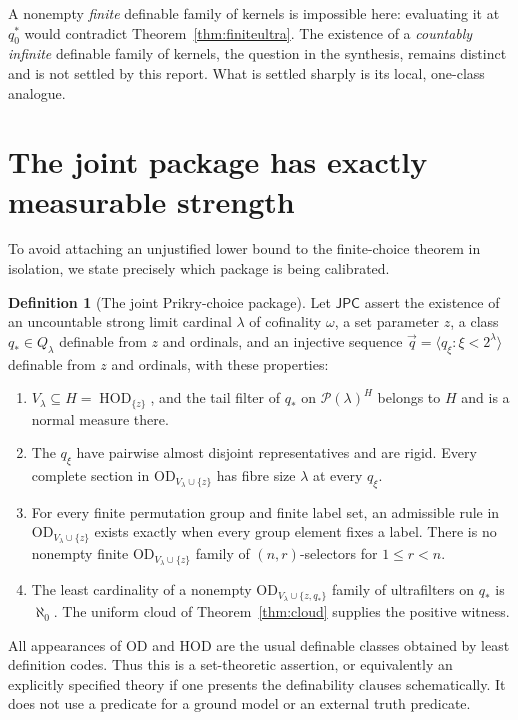 \documentclass[11pt,letterpaper]{article}
\theoremstyle{definition}
\newtheorem{definition}{Definition}[section]
\numberwithin{equation}{section}
\newcommand{\HOD}{\mathrm{HOD}}
\newcommand{\OD}{\mathrm{OD}}
\newcommand{\Pow}{\mathcal P}
\newcommand{\HD}[1]{\operatorname{HOD}_{\{#1\}}}
\begin{document}
A nonempty \emph{finite} definable family of kernels is impossible here: evaluating it at $q_0^*$ would contradict Theorem~\ref{thm:finiteultra}. The existence of a \emph{countably infinite} definable family of kernels, the question in the synthesis, remains distinct and is not settled by this report. What is settled sharply is its local, one-class analogue.

\section{The joint package has exactly measurable strength}\label{sec:consistency}

To avoid attaching an unjustified lower bound to the finite-choice theorem in isolation, we state precisely which package is being calibrated.

\begin{definition}[The joint Prikry-choice package]\label{def:package}
Let $\mathsf{JPC}$ assert the existence of an uncountable strong limit cardinal $\lambda$ of cofinality $\omega$, a set parameter $z$, a class $q_*\in Q_\lambda$ definable from $z$ and ordinals, and an injective sequence $\vec q=\langle q_\xi:\xi<2^\lambda\rangle$ definable from $z$ and ordinals, with these properties:
\begin{enumerate}
\item $V_\lambda\subseteq H=\HD{z}$, and the tail filter of $q_*$ on $\Pow(\lambda)^H$ belongs to $H$ and is a normal measure there.
\item The $q_\xi$ have pairwise almost disjoint representatives and are rigid. Every complete section in $\OD_{V_\lambda\cup\{z\}}$ has fibre size $\lambda$ at every $q_\xi$.
\item For every finite permutation group and finite label set, an admissible rule in $\OD_{V_\lambda\cup\{z\}}$ exists exactly when every group element fixes a label. There is no nonempty finite $\OD_{V_\lambda\cup\{z\}}$ family of $(n,r)$-selectors for $1\le r<n$.
\item The least cardinality of a nonempty $\OD_{V_\lambda\cup\{z,q_*\}}$ family of ultrafilters on $q_*$ is $\aleph_0$. The uniform cloud of Theorem~\ref{thm:cloud} supplies the positive witness.
\end{enumerate}
\end{definition}

All appearances of $\OD$ and $\HOD$ are the usual definable classes obtained by least definition codes. Thus this is a set-theoretic assertion, or equivalently an explicitly specified theory if one presents the definability clauses schematically. It does not use a predicate for a ground model or an external truth predicate.
\end{document}
